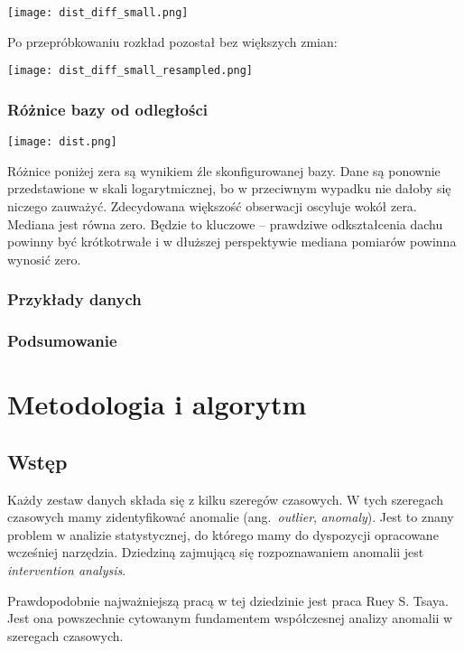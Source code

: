 \documentclass[12pt]{article}
\begin{document}
    \texttt{[image: dist\_diff\_small.png]}

    Po przepróbkowaniu rozkład pozostał bez większych zmian:

    \texttt{[image: dist\_diff\_small\_resampled.png]}

    \subsubsection{Różnice bazy od odległości}

    \texttt{[image: dist.png]}

    Różnice poniżej zera są wynikiem źle skonfigurowanej bazy. Dane są ponownie przedstawione w skali logarytmicznej,
    bo w przeciwnym wypadku nie dałoby się niczego zauważyć. Zdecydowana większość obserwacji oscyluje wokół zera.
    Mediana jest równa zero. Będzie to kluczowe -- prawdziwe odkształcenia dachu powinny być krótkotrwałe i w
    dłuższej perspektywie mediana pomiarów powinna wynosić zero.

    \subsubsection{Przykłady danych}

    \subsubsection{Podsumowanie}


    \section{Metodologia i algorytm}\label{sec:metodologia-i-algorytm}

    \subsection{Wstęp}\label{subsec:wstep}
    Każdy zestaw danych składa się z kilku szeregów czasowych. W tych szeregach czasowych mamy zidentyfikować
    anomalie (ang.\ \emph{outlier}, \emph{anomaly}). Jest to znany problem w analizie statystycznej, do którego mamy
    do dyspozycji opracowane wcześniej narzędzia. Dziedziną zajmującą się rozpoznawaniem anomalii jest
    \emph{intervention analysis}.

    Prawdopodobnie najważniejszą pracą w tej dziedzinie jest praca Ruey S. Tsaya\cite{https://doi.org/10.1002/for.3980070102}.
    Jest ona powszechnie cytowanym fundamentem współczesnej analizy anomalii w szeregach czasowych.
\end{document}
